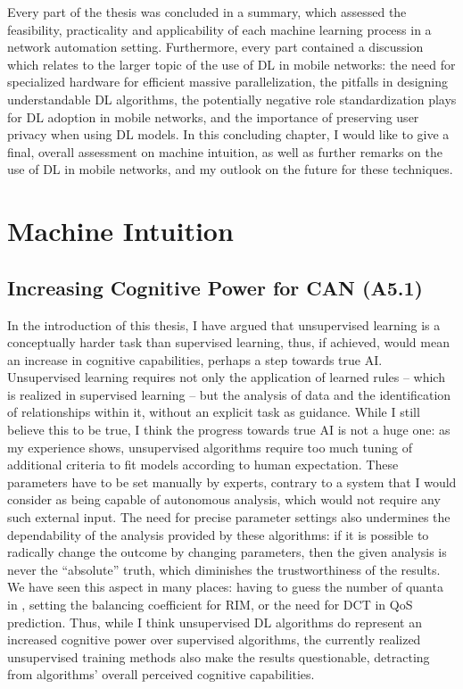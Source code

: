 	Every part of the thesis was concluded in a summary, which assessed the feasibility, practicality and applicability of each machine learning process in a network automation setting.
	Furthermore, every part contained a discussion which relates to the larger topic of the use of \ac{DL} in mobile networks: the need for specialized hardware for efficient massive parallelization, the pitfalls in designing understandable \ac{DL} algorithms, the potentially negative role standardization plays for \ac{DL} adoption in mobile networks, and the importance of preserving user privacy when using \ac{DL} models.	
	In this concluding chapter, I would like to give a final, overall assessment on machine intuition, as well as further remarks on the use of \ac{DL} in mobile networks, and my outlook on the future for these techniques.	

	\section{Machine Intuition}
	
		\subsection{Increasing Cognitive Power for CAN (A5.1)}
		
			In the introduction of this thesis, I have argued that unsupervised learning is a conceptually harder task than supervised learning, thus, if achieved, would mean an increase in cognitive capabilities, perhaps a step towards true \ac{AI}.
			Unsupervised learning requires not only the application of learned rules -- which is realized in supervised learning -- but the analysis of data and the identification of relationships within it, without an explicit task as guidance.
			While I still believe this to be true, I think the progress towards true \ac{AI} is not a huge one: as my experience shows, unsupervised algorithms require too much tuning of additional criteria to fit models according to human expectation.
			These parameters have to be set manually by experts, contrary to a system that I would consider as being capable of autonomous analysis, which would not require any such external input.
			The need for precise parameter settings also undermines the dependability of the analysis provided by these algorithms: if it is possible to radically change the outcome by changing parameters, then the given analysis is never the ``absolute'' truth, which diminishes the trustworthiness of the results.
			We have seen this aspect in many places: having to guess the number of quanta in \kmeans{}, setting the balancing coefficient for \ac{RIM}, or the need for \ac{DCT} in \ac{QoS} prediction.
			Thus, while I think unsupervised \ac{DL} algorithms do represent an increased cognitive power over supervised algorithms, the currently realized unsupervised training methods also make the results questionable, detracting from algorithms' overall perceived cognitive capabilities.
			
